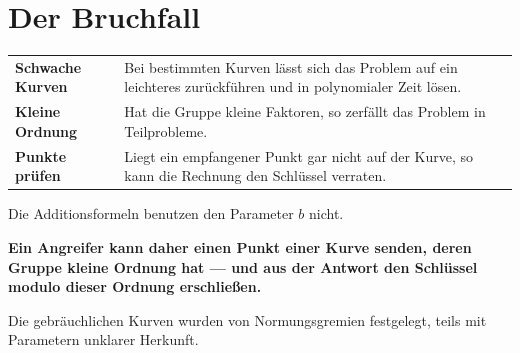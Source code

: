 \section{Der Bruchfall}

\begin{warnung}
\begin{center}
{\small
\renewcommand{\arraystretch}{1.52}
\begin{tabular}{@{}P{2.4cm}P{6.2cm}@{}}
\toprule
\textbf{Schwache Kurven} & Bei bestimmten Kurven lässt sich das Problem auf ein leichteres zurückführen und in polynomialer Zeit lösen.\\
\textbf{Kleine Ordnung} & Hat die Gruppe kleine Faktoren, so zerfällt das Problem in Teilprobleme.\\
\textbf{Punkte prüfen} & Liegt ein empfangener Punkt gar nicht auf der Kurve, so kann die Rechnung den Schlüssel verraten.\\
\bottomrule
\end{tabular}}
\end{center}

Die Additionsformeln benutzen den Parameter $b$ nicht.

\begin{center}
\begin{minipage}{0.9\textwidth}
\textbf{Ein Angreifer kann daher einen Punkt einer  Kurve senden, deren Gruppe kleine Ordnung hat --- und aus der Antwort den Schlüssel modulo dieser Ordnung erschließen.}
\end{minipage}
\end{center}

\begin{center}
\begin{minipage}{0.88\textwidth}
\end{minipage}
\end{center}

Die gebräuchlichen Kurven wurden von Normungsgremien festgelegt, teils mit Parametern unklarer Herkunft.

\begin{center}
\begin{minipage}{0.88\textwidth}
\end{minipage}
\end{center}
\end{warnung}

